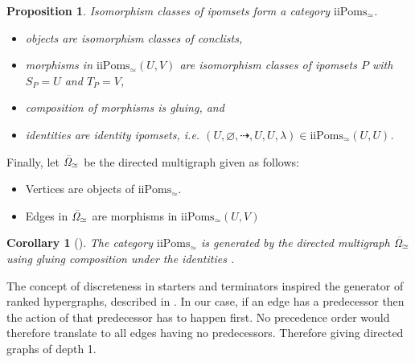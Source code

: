 \documentclass[12pt]{article}
\newtheorem{prop}[theorem]{Proposition}
\newtheorem{corollary}[theorem]{Corollary}
\theoremstyle{definition}
\newcommand{\1}{\mathbbm{1}}
\begin{document}
\begin{prop}
    Isomorphism classes of ipomsets form a category $\mathrm{iiPoms}_{\simeq}$.
    \begin{itemize}
        \item objects are isomorphism classes of conclists,
        \item morphisms in $\mathrm{iiPoms}_{\simeq}(U,V)$ are isomorphism classes of ipomsets $P$ with $S_P = U$ and $T_P = V$,
        \item composition of morphisms is gluing, and
        \item identities are identity ipomsets, i.e. $(U, \varnothing, \dashrightarrow, U, U, \lambda)\in\mathrm{iiPoms}_{\simeq}(U,U)$.
    \end{itemize}
\end{prop}

Finally, let $\mathit{\Bar{\Omega}_{\simeq}}$ be the directed multigraph given as follows:
\begin{itemize}
    \item Vertices are objects of $\mathrm{iiPoms}_{\simeq}$.
    \item Edges in $\mathit{\Bar{\Omega}_{\simeq}}$ are morphisms in $\mathrm{iiPoms}_{\simeq}(U,V)$
\end{itemize}

\begin{corollary}[\cite{ipomsets2024}]
    The category $\mathrm{iiPoms}_{\simeq}$ is generated by the directed multigraph $\mathit{\Bar{\Omega}_{\simeq}}$ using gluing composition under the identities \cite[equation. (2)]{ipomsets2024}.
\end{corollary}

The concept of discreteness in starters and terminators inspired the generator of ranked hypergraphs, described in . In our case, if an edge has a predecessor then the action of that predecessor has to happen first. No precedence order would therefore translate to all edges having no predecessors. Therefore giving directed graphs of depth 1.
\end{document}

